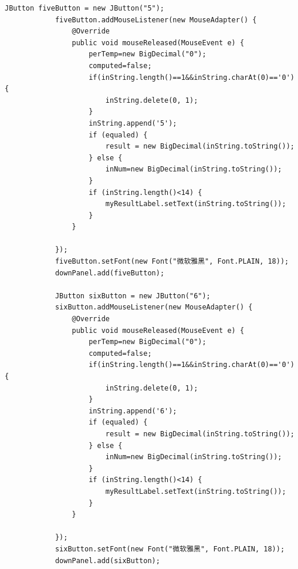 \documentclass{ctexart}
\begin{document}
\begin{lstlisting}[caption=冗杂的代码]
            JButton fiveButton = new JButton("5");
            fiveButton.addMouseListener(new MouseAdapter() {
                @Override
                public void mouseReleased(MouseEvent e) {
                    perTemp=new BigDecimal("0");
                    computed=false;
                    if(inString.length()==1&&inString.charAt(0)=='0') {
                        inString.delete(0, 1);
                    }
                    inString.append('5');
                    if (equaled) {
                        result = new BigDecimal(inString.toString());		
                    } else {
                        inNum=new BigDecimal(inString.toString());
                    }
                    if (inString.length()<14) {
                        myResultLabel.setText(inString.toString());
                    }
                }
            
            });
            fiveButton.setFont(new Font("微软雅黑", Font.PLAIN, 18));
            downPanel.add(fiveButton);
            
            JButton sixButton = new JButton("6");
            sixButton.addMouseListener(new MouseAdapter() {
                @Override
                public void mouseReleased(MouseEvent e) {
                    perTemp=new BigDecimal("0");
                    computed=false;
                    if(inString.length()==1&&inString.charAt(0)=='0') {
                        inString.delete(0, 1);
                    }
                    inString.append('6');
                    if (equaled) {
                        result = new BigDecimal(inString.toString());		
                    } else {
                        inNum=new BigDecimal(inString.toString());
                    }
                    if (inString.length()<14) {
                        myResultLabel.setText(inString.toString());
                    }
                }
            
            });
            sixButton.setFont(new Font("微软雅黑", Font.PLAIN, 18));
            downPanel.add(sixButton);
            

\end{lstlisting}
\end{document}
